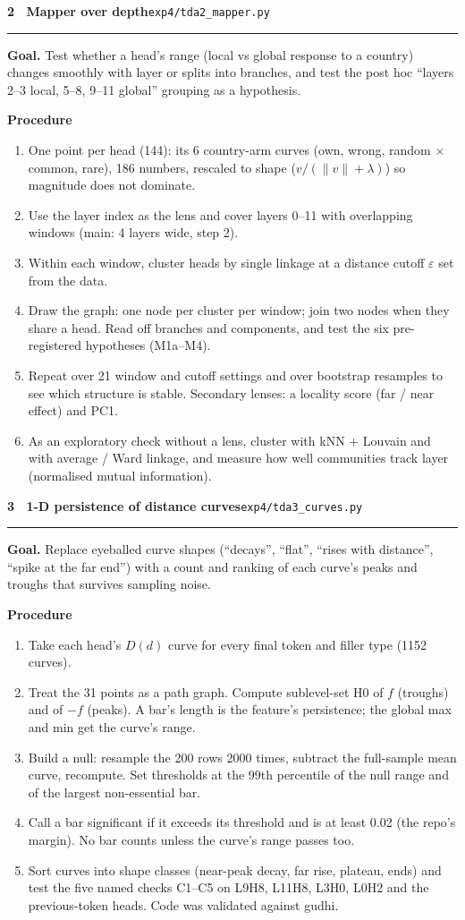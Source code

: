 \documentclass[10pt]{article}
\newcommand{\analysis}[3]{%
  \vspace{5pt}
  {\large\bfseries #1}\hfill{\color{muted}\footnotesize #2}\\[-3pt]\rule{\linewidth}{0.5pt}\par
  \colorbox{plane}{\parbox{\dimexpr\linewidth-2\fboxsep}{\small\textbf{Goal.} #3}}\par\vspace{1pt}
  {\small\textbf{Procedure}}\par\small}
\begin{document}
\analysis{2 \textperiodcentered\ Mapper over depth}{\texttt{exp4/tda2\_mapper.py}}
{Test whether a head's range (local vs global response to a country) changes smoothly with layer or splits into
branches, and test the post hoc ``layers 2--3 local, 5--8, 9--11 global'' grouping as a hypothesis.}
\begin{enumerate}
\item One point per head (144): its 6 country-arm curves (own, wrong, random $\times$ common, rare), 186 numbers,
  rescaled to shape ($v/(\lVert v\rVert+\lambda)$) so magnitude does not dominate.
\item Use the layer index as the lens and cover layers 0--11 with overlapping windows (main: 4 layers wide, step 2).
\item Within each window, cluster heads by single linkage at a distance cutoff $\varepsilon$ set from the data.
\item Draw the graph: one node per cluster per window; join two nodes when they share a head. Read off branches and
  components, and test the six pre-registered hypotheses (M1a--M4).
\item Repeat over 21 window and cutoff settings and over bootstrap resamples to see which structure is stable.
  Secondary lenses: a locality score (far / near effect) and PC1.
\item As an exploratory check without a lens, cluster with kNN + Louvain and with average / Ward linkage, and measure
  how well communities track layer (normalised mutual information).
\end{enumerate}

\analysis{3 \textperiodcentered\ 1-D persistence of distance curves}{\texttt{exp4/tda3\_curves.py}}
{Replace eyeballed curve shapes (``decays'', ``flat'', ``rises with distance'', ``spike at the far end'') with a count
and ranking of each curve's peaks and troughs that survives sampling noise.}
\begin{enumerate}
\item Take each head's $D(d)$ curve for every final token and filler type (1152 curves).
\item Treat the 31 points as a path graph. Compute sublevel-set H0 of $f$ (troughs) and of $-f$ (peaks). A bar's
  length is the feature's persistence; the global max and min get the curve's range.
\item Build a null: resample the 200 rows 2000 times, subtract the full-sample mean curve, recompute. Set thresholds at
  the 99th percentile of the null range and of the largest non-essential bar.
\item Call a bar significant if it exceeds its threshold and is at least 0.02 (the repo's margin). No bar counts unless
  the curve's range passes too.
\item Sort curves into shape classes (near-peak decay, far rise, plateau, ends) and test the five named checks
  C1--C5 on L9H8, L11H8, L3H0, L0H2 and the previous-token heads. Code was validated against gudhi.
\end{enumerate}
\end{document}
